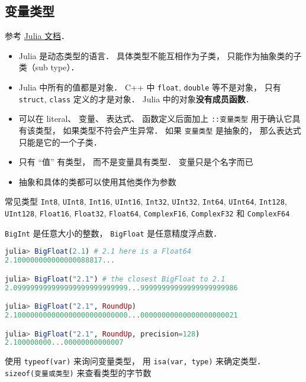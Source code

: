 
\begin{issues}
\issueDraft
\end{issues}

\subsection{变量类型}

参考 \href{https://docs.julialang.org/en/v1/manual/types/#man-declared-types}{Julia 文档}．
\begin{itemize}
\item Julia 是动态类型的语言． 具体类型不能互相作为子类， 只能作为抽象类的子类（sub type）．
\item Julia 中所有的值都是对象． C++ 中 \verb|float|, \verb|double| 等不是对象， 只有 \verb|struct|, \verb|class| 定义的才是对象． Julia 中的对象\textbf{没有成员函数}．
\item 可以在 literal、 变量、 表达式、 函数定义后面加上 \verb|::变量类型| 用于确认它具有该类型， 如果类型不符会产生异常． 如果 \verb|变量类型| 是抽象的， 那么表达式只能是它的一个子类．
\item 只有 “值” 有类型， 而不是变量具有类型． 变量只是个名字而已
\item 抽象和具体的类都可以使用其他类作为参数
\end{itemize}

常见类型
\verb|Int8|, \verb|UInt8|, \verb|Int16|, \verb|UInt16|, \verb|Int32|, \verb|UInt32|, \verb|Int64|, \verb|UInt64|, \verb|Int128|, \verb|UInt128|, \verb|Float16|, \verb|Float32|, \verb|Float64|, \verb|ComplexF16|, \verb|ComplexF32| 和 \verb|ComplexF64|

\verb|BigInt| 是任意大小的整数， \verb|BigFloat| 是任意精度浮点数．

\begin{lstlisting}[language=julia]
julia> BigFloat(2.1) # 2.1 here is a Float64
2.100000000000000088817...

julia> BigFloat("2.1") # the closest BigFloat to 2.1
2.099999999999999999999999999...99999999999999999999986

julia> BigFloat("2.1", RoundUp)
2.100000000000000000000000000...00000000000000000000021

julia> BigFloat("2.1", RoundUp, precision=128)
2.100000000...00000000000007
\end{lstlisting}

使用 \verb|typeof(var)| 来询问变量类型， 用 \verb|isa(var, type)| 来确定类型． \verb|sizeof(变量或类型)| 来查看类型的字节数

